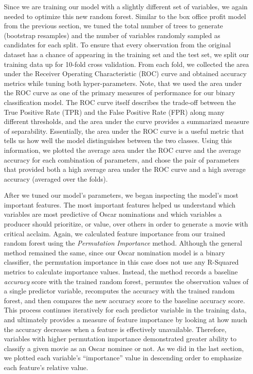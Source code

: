 \documentclass[10pt]{article}
\begin{document}
Since we are training our model with a slightly different set of variables, we again needed to optimize this new random forest. Similar to the box office profit model from the previous section, we tuned the total number of trees to generate (bootstrap resamples) and the number of variables randomly sampled as candidates for each split. To ensure that every observation from the original dataset has a chance of appearing in the training set and the test set, we split our training data up for 10-fold cross validation. From each fold, we collected the area under the Receiver Operating Characteristic (ROC) curve and obtained accuracy metrics while tuning both hyper-parameters. Note, that we used the area under the ROC curve as one of the primary measures of performance for our binary classification model. The ROC curve itself describes the trade-off between the True Positive Rate (TPR) and the False Positive Rate (FPR) along many different thresholds, and the area under the curve provides a summarized measure of separability. Essentially, the area under the ROC curve is a useful metric that tells us how well the model distinguishes between the two classes. Using this information, we plotted the average area under the ROC curve and the average accuracy for each combination of parameters, and chose the pair of parameters that provided both a high average area under the ROC curve and a high average accuracy (averaged over the folds). 

After we tuned our model’s parameters, we began inspecting the model’s most important features. The most important features helped us understand which variables are most predictive of Oscar nominations and which variables a producer should prioritize, or value, over others in order to generate a movie with critical acclaim. Again, we calculated feature importance from our trained random forest using the \textit{Permutation Importance} method. Although the general method remained the same, since our Oscar nomination model is a binary classifier, the permutation importance in this case does not use any R-Squared metrics to calculate importance values. Instead, the method records a baseline \textit{accuracy} score with the trained random forest, permutes the observation values of a single predictor variable, recomputes the accuracy with the trained random forest, and then compares the new accuracy score to the baseline accuracy score. This process continues iteratively for each predictor variable in the training data, and ultimately provides a measure of feature importance by looking at how much the accuracy decreases when a feature is effectively unavailable. Therefore, variables with higher permutation importance demonstrated greater ability to classify a given movie as an Oscar nominee or not. As we did in the last section, we plotted each variable’s “importance” value in descending order to emphasize each feature’s relative value. 
\end{document}
